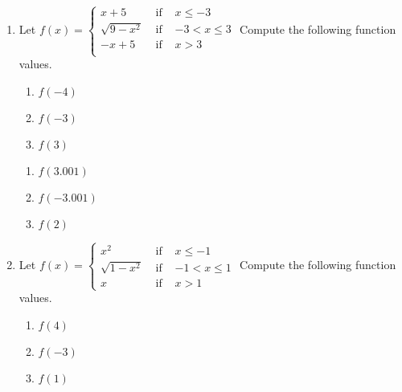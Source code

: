 \begin{enumerate}
\setcounter{enumi}{\value{HW}}

\item  Let $f(x) = \left\{  \begin{array}{rcr} x + 5 & \mbox{ if } & x \leq -3 \\ \sqrt{9-x^2} & \mbox{ if } & -3 < x \leq 3 \\ -x+5 & \mbox{ if } & x > 3 \\ \end{array}        \right.$ Compute the following function values.

\begin{multicols}{3}
\begin{enumerate}

\item $f(-4)$
\item  $f(-3)$
\item  $f(3)$

\setcounter{HWindent}{\value{enumii}}
\end{enumerate}
\end{multicols}

\begin{multicols}{3}
\begin{enumerate}
\setcounter{enumii}{\value{HWindent}}

\item  $f(3.001)$
\item  $f(-3.001)$
\item  $f(2)$

\setcounter{HWindent}{\value{enumii}}
\end{enumerate}
\end{multicols}

\newpage

\item Let ${\displaystyle f(x) = \left\{ \begin{array}{rcr}
x^{2} & \mbox{ if } & x \leq -1\\
\sqrt{1 - x^{2}} & \mbox{ if } & -1 < x \leq 1\\
x & \mbox{ if } & x > 1  \end{array} \right. }$  Compute the following function values.

\begin{multicols}{3}
\begin{enumerate}

\item $f(4)$
\item $f(-3)$
\item $f(1)$


\end{enumerate}
\end{multicols}
\end{enumerate}
